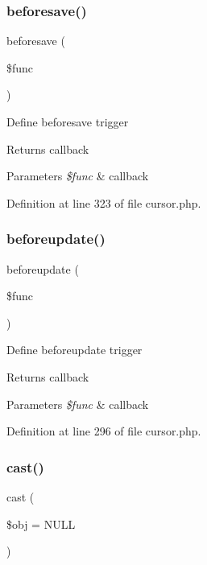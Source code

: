 \subsubsection{\texorpdfstring{beforesave()}{beforesave()}}
{\footnotesize\ttfamily beforesave (\begin{DoxyParamCaption}\item[{}]{\$func }\end{DoxyParamCaption})}

Define beforesave trigger \begin{DoxyReturn}{Returns}
callback 
\end{DoxyReturn}

\begin{DoxyParams}{Parameters}
{\em \$func} & callback \\
\hline
\end{DoxyParams}


Definition at line 323 of file cursor.\+php.

\hypertarget{class_d_b_1_1_cursor_a9f11326bbf4cdec47ac4f1d143f1dfba}{}\label{class_d_b_1_1_cursor_a9f11326bbf4cdec47ac4f1d143f1dfba} 
\subsubsection{\texorpdfstring{beforeupdate()}{beforeupdate()}}
{\footnotesize\ttfamily beforeupdate (\begin{DoxyParamCaption}\item[{}]{\$func }\end{DoxyParamCaption})}

Define beforeupdate trigger \begin{DoxyReturn}{Returns}
callback 
\end{DoxyReturn}

\begin{DoxyParams}{Parameters}
{\em \$func} & callback \\
\hline
\end{DoxyParams}


Definition at line 296 of file cursor.\+php.

\hypertarget{class_d_b_1_1_cursor_aa33294a722f17e6e4946223bb73f13ab}{}\label{class_d_b_1_1_cursor_aa33294a722f17e6e4946223bb73f13ab} 
\subsubsection{\texorpdfstring{cast()}{cast()}}
{\footnotesize\ttfamily cast (\begin{DoxyParamCaption}\item[{}]{\$obj = {\ttfamily NULL} }\end{DoxyParamCaption})\hspace{0.3cm}{\ttfamily [abstract]}}

